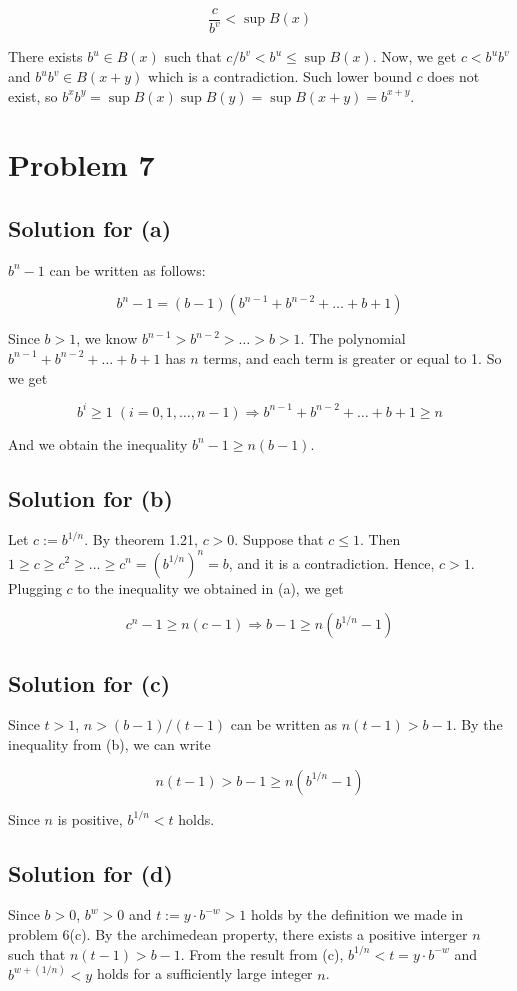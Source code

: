 \documentclass{scrartcl}
\begin{document}
\[
  \frac{c}{b^v} < \sup B(x)
\]

There exists \(b^u \in B(x)\) such that \(c / b^v < b^u \leq \sup B(x)\).
Now, we get \(c < b^u b^v\) and \(b^u b^v \in B(x + y)\) which is a contradiction.
Such lower bound \(c\) does not exist, so \(b^x b^y = \sup B(x) \sup B(y) = \sup B(x + y) = b^{x + y}\).

\section{Problem 7}
\subsection{Solution for (a)}
\(b^n - 1\) can be written as follows:

\[
  b^n - 1 = (b - 1)(b^{n - 1} + b^{n - 2} + \dots + b + 1)
\]

Since \(b > 1\), we know \(b^{n - 1} > b^{n - 2} > \dots > b > 1\).
The polynomial \(b^{n - 1} + b^{n - 2} + \dots + b + 1\) has \(n\) terms, and each term is greater or equal to 1.
So we get

\[
  b^i \geq 1 \; (i = 0, 1, \dots, n - 1) \Longrightarrow b^{n - 1} + b^{n - 2} + \dots + b + 1 \geq n
\]

And we obtain the inequality \(b^n - 1 \geq n(b - 1)\).

\subsection{Solution for (b)}
Let \(c := b^{1 / n}\). By theorem 1.21, \(c > 0\). Suppose that \(c \leq 1\).
Then \(1 \geq c \geq c^2 \geq \dots \geq c^n = (b^{1 / n})^n = b\), and it is a contradiction.
Hence, \(c > 1\). Plugging \(c\) to the inequality we obtained in (a), we get

\[
  c^n - 1 \geq n(c - 1) \Longrightarrow b - 1 \geq n(b^{1 / n} - 1)
\]

\subsection{Solution for (c)}
Since \(t > 1\), \(n > (b - 1) / (t - 1)\) can be written as \(n(t - 1) > b - 1\).
By the inequality from (b), we can write

\[
  n(t - 1) > b - 1 \geq n(b^{1 / n} - 1)
\]

Since \(n\) is positive, \(b^{1 / n} < t\) holds.

\subsection{Solution for (d)}
Since \(b > 0\), \(b^w > 0\) and \(t := y \cdot b^{-w} > 1\) holds by the definition we made in problem 6(c).
By the archimedean property, there exists a positive interger \(n\) such that \(n(t - 1) > b - 1\).
From the result from (c), \(b^{1 / n} < t = y \cdot b^{-w}\) and \(b^{w + (1 / n)} < y\) holds for a sufficiently large integer \(n\).
\end{document}
